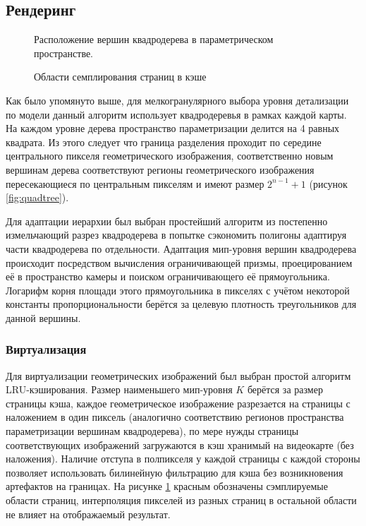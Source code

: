 \documentclass[12pt]{extarticle}
\begin{document}
\subsection{Рендеринг}
\begin{figure}[ht]
  \centering
  \caption{Расположение вершин квадродерева в параметрическом пространстве.}
  \label{fig:quadtree}
\endminipage\hfill
%
  \centering
  \caption{Области семплирования страниц в кэше }
  \label{fig:cache}
\endminipage
\end{figure}
Как было упомянуто выше, для мелкогранулярного выбора уровня детализации по модели данный алгоритм использует квадродеревья в рамках каждой карты. На каждом уровне дерева пространство параметризации делится на 4 равных квадрата. Из этого следует что граница разделения проходит по середине центрального пикселя геометрического изображения, соответственно новым вершинам дерева соответствуют регионы геометрического изображения пересекающиеся по центральным пикселям и имеют размер $2^{n-1} + 1$ (рисунок \ref{fig:quadtree}).

Для адаптации иерархии был выбран простейший алгоритм из \cite{niski2007multi} постепенно измельчающий разрез квадродерева в попытке сэкономить полигоны адаптируя части квадродерева по отдельности. Адаптация мип-уровня вершин квадродерева происходит посредством вычисления ограничивающей призмы, проецированием её в пространство камеры и поиском ограничивающего её прямоугольника. Логарифм корня площади этого прямоугольника в пикселях с учётом некоторой константы пропорциональности берётся за целевую плотность треугольников для данной вершины.


\subsubsection{Виртуализация}
Для виртуализации геометрических изображений был выбран простой алгоритм LRU-кэширования. Размер наименьшего мип-уровня $K$ берётся за размер страницы кэша, каждое геометрическое изображение разрезается на страницы с наложением в один пиксель (аналогично соответствию регионов пространства параметризации вершинам квадродерева), по мере нужды страницы соответствующих изображений загружаются в кэш хранимый на видеокарте (без наложения). Наличие отступа в полпикселя у каждой страницы с каждой стороны позволяет использовать билинейную фильтрацию для кэша без возникновения артефактов на границах. На рисунке \ref{fig:cache} красным обозначены сэмплируемые области страниц, интерполяция пикселей из разных страниц в остальной области не влияет на отображаемый результат.
\end{document}
